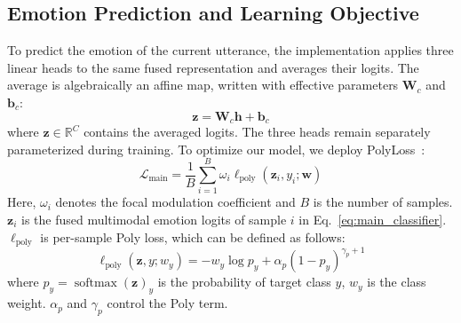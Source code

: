 \documentclass[letterpaper]{article} %
\begin{document}

\subsection{Emotion Prediction and Learning Objective}
To predict the emotion of the current utterance, the implementation applies three linear heads to the same fused representation and averages their logits. The average is algebraically an affine map, written with effective parameters $\mathbf{W}_{c}$ and $\mathbf{b}_{c}$:
\begin{equation}
\mathbf{z}=\mathbf{W}_{c}\mathbf{h}+\mathbf{b}_{c}
\label{eq:main_classifier}
\end{equation}
where $\mathbf{z}\in\mathbb{R}^{C}$ contains the averaged logits. The three heads remain separately parameterized during training.
To optimize our model, we deploy PolyLoss~\cite{polyloss}: 
\begin{equation}
\mathcal{L}_{\mathrm{main}}
=\frac{1}{B}\sum_{i=1}^{B}
  \omega_i
  \ell_{\mathrm{poly}}
  (\mathbf{z}_{i},y_i;\mathbf{w})
\label{eq:main_loss}
\end{equation}
Here, $\omega_i$ denotes the focal modulation coefficient and $B$ is the number of samples. $\mathbf{z}_i$ is the fused multimodal emotion logits of sample $i$ in Eq.~\eqref{eq:main_classifier}. $\ell_{\mathrm{poly}}$ is per-sample Poly loss, which can be defined as follows:
\begin{equation}
\ell_{\mathrm{poly}}(\mathbf{z},y; w_y)
=-w_y\log p_y+\alpha_p(1-p_y)^{\gamma_p+1}
\label{eq:poly_loss}
\end{equation}
where $p_y=\operatorname{softmax}(\mathbf{z})_y$ is the probability of target class $y$, $w_y$ is the class weight. $\alpha_p$ and $\gamma_p$ control the Poly term.
\end{document}
